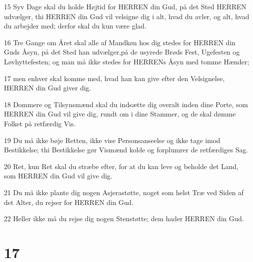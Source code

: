 \par 15 Syv Dage skal du holde Højtid for HERREN din Gud, på det Sted HERREN udvælger, thi HERREN din Gud vil velsigne dig i alt, hvad du avler, og alt, hvad du arbejder med; derfor skal du kun være glad.
\par 16 Tre Gange om Året skal alle af Mandkøn hos dig stedes for HERREN din Guds Åsyn, på det Sted han udvælger,på de usyrede Brøds Fest, Ugefesten og Løvhyttefesten; og man må ikke stedes for HERRENs Åsyn med tomme Hænder;
\par 17 men enhver skal komme med, hvad han kan give efter den Velsignelse, HERREN din Gud giver dig.
\par 18 Dommere og Tilsynsmænd skal du indsætte dig overalt inden dine Porte, som HERREN din Gud vil give dig, rundt om i dine Stammer, og de skal dømme Folket på retfærdig Vis.
\par 19 Du må ikke bøje Retten, ikke vise Personsanseelse og ikke tage imod Bestikkelse; thi Bestikkelse gør Vismænd kolde og forplumrer de retfærdiges Sag.
\par 20 Ret, kun Ret skal du stræbe efter, for at du kan leve og beholde det Land, som HERREN din Gud vil give dig.
\par 21 Du må ikke plante dig nogen Asjerastøtte, noget som helst Træ ved Siden af det Alter, du rejser for HERREN din Gud.
\par 22 Heller ikke må du rejse dig nogen Stenstøtte; dem hader HERREN din Gud.

\chapter{17}

